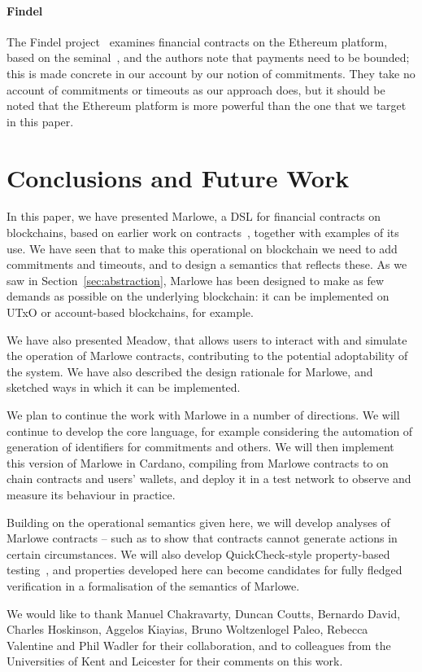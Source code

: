 \documentclass[runningheads]{llncs}
\begin{document}
\paragraph{Findel}

The Findel project~\cite{findel} examines financial contracts on the Ethereum platform, based on the 
seminal~\cite{PeytonJones:2000}, and the authors note that payments need to be bounded; this is made concrete in our 
account by our notion of commitments. They take no account of commitments or timeouts as our approach does, but it should be 
noted that the Ethereum platform is more powerful than the one that we target in this paper.


\section{Conclusions and Future Work}
\label{section:next-steps}

In this paper, we have presented Marlowe, a DSL for financial contracts on blockchains, based on earlier work on contracts~\cite{PeytonJones:2000}, together with examples of its use. We have seen that to make this operational on blockchain we need to add commitments and timeouts, and to design a semantics that reflects these. As we saw in Section~\ref{sec:abstraction}, Marlowe has been designed to make as few demands as possible on the underlying blockchain: it can be implemented on UTxO or account-based blockchains, for example.

We have also presented Meadow, that allows users to interact with and simulate the operation of Marlowe contracts, contributing to the potential adoptability of the system. We have also described the design rationale for Marlowe, and sketched ways in which it can be implemented.

We plan to continue the work with Marlowe in a number of directions. We will continue to develop the core language, for example considering the automation of generation of identifiers for commitments and others. We will then implement this version of Marlowe in Cardano, compiling from Marlowe contracts to on chain contracts and users' wallets, and deploy it in a test network to observe and measure its behaviour in practice.

Building on the operational semantics given here, we will develop analyses of Marlowe contracts -- such as to show that contracts cannot generate  actions in certain circumstances. We will also develop  QuickCheck-style property-based testing~\cite{quickCheck}, and properties developed here can become candidates for fully fledged verification in a formalisation of the semantics of Marlowe.

We would like to thank Manuel Chakravarty, Duncan Coutts, Bernardo David, Charles Hoskinson, Aggelos Kiayias, %
Bruno Woltzenlogel Paleo, Rebecca Valentine and Phil Wadler for their collaboration, and to colleagues from the Universities of 
Kent and Leicester for their comments on this work.





\end{document}
